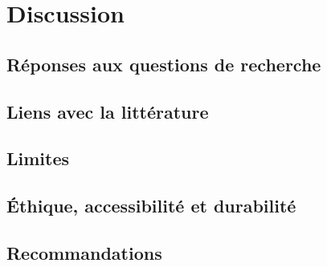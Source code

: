 
\chapter{Discussion}\label{chap:discussion}

\section{Réponses aux questions de recherche}

\section{Liens avec la littérature}

\section{Limites}

\section{Éthique, accessibilité et durabilité}

\section{Recommandations}
